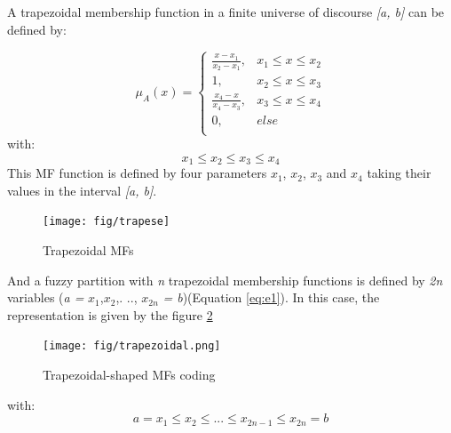\documentclass[conference]{IEEEtran}
\begin{document}
A trapezoidal membership function in a finite universe of discourse \textit{[a, b]} can be defined by:

\begin{equation}
\mu_{A}(x)= \left \{
\begin{array}{ll}
\frac{x - x_{1}}{x_{2} - x_{1}},& x_{1} \leq x \leq x_{2}\\
1 , &x_{2} \leq x \leq x_{3}\\
\frac{x_{4} - x}{x_{4} - x_{3}},& x_{3} \leq x \leq x_{4}\\
0        ,& else\\	
\end{array}
\right.
\label{eq:trapmf}
\end{equation}
with:
\begin{equation}
x_{1} \leq x_{2} \leq x_{3} \leq x_{4}
\end{equation}
This MF function is defined by four parameters $x_{1}$, $x_{2}$,
$x_{3}$ and $x_{4}$ taking their values in the interval \textit{[a,
  b]}.%

\begin{figure}[!ht] 
	\begin{center}
		\texttt{[image: fig/trapese]}
		\caption {Trapezoidal MFs}
		\label{fig:trapeze}
	\end{center}
\end{figure}
And a fuzzy partition with \textit{n} trapezoidal membership functions
is defined by \textit{2n} variables (\textit{a =} $ x_{1}$,$x_{2}
$,. .., $x_{2n} $ \textit {= b})(Equation \ref{eq:e1}). In this case,
the representation is given by the
figure \ref{fig:at} 
\begin{figure}[!ht] 
	\begin{center}
		\texttt{[image: fig/trapezoidal.png]}
		\caption {Trapezoidal-shaped MFs coding}
		\label{fig:at}
	\end{center}
\end{figure}
with:
\begin{equation}
a = x_{1} \leq x_{2} \leq...\leq x_{2n-1} \leq x_{2n}=b 	
\end{equation}		
\end{document}
